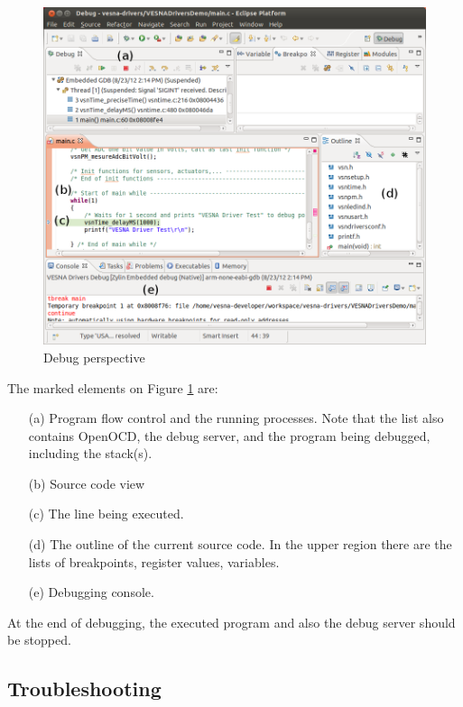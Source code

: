 \documentclass[a4paper, 10pt]{article}
\begin{document}
    \begin{figure}[H]
    \centering
        \includegraphics[width=\textwidth]{./install-guide-linux-images/debug-window.png}
        \caption{Debug perspective}
        \label{fig:debug-window}
    \end{figure}

The marked elements on Figure \ref{fig:debug-window} are:
    \begin{itemize}
    \item[(a)] Program flow control and the running processes.
        Note that the list also contains OpenOCD, the debug server,
        and the program being debugged, including the stack(s).
    \item[(b)] Source code view
    \item[(c)] The line being executed.
    \item[(d)] The outline of the current source code.
        In the upper region there are the lists of breakpoints, register values,
        variables.
    \item[(e)] Debugging console.
    \end{itemize}

At the end of debugging, the executed program and also the
debug server should be stopped.

\subsection{Troubleshooting}
\end{document}
